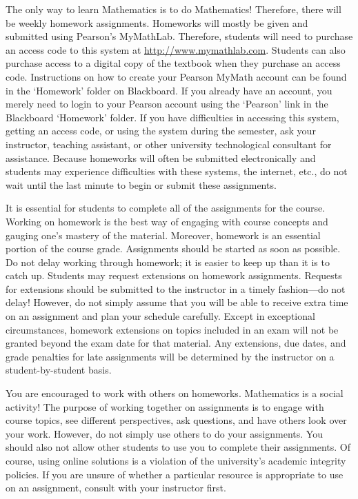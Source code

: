 \documentclass[11pt,letterpaper]{article}
\begin{document}

The only way to learn Mathematics is to do Mathematics! Therefore, there will be weekly homework assignments. Homeworks will mostly be given and submitted using Pearson's MyMathLab. Therefore, students will need to purchase an access code to this system at \url{http://www.mymathlab.com}. Students can also purchase access to a digital copy of the textbook when they purchase an access code. Instructions on how to create your Pearson MyMath account can be found in the `Homework' folder on Blackboard. If you already have an account, you merely need to login to your Pearson account using the `Pearson' link in the Blackboard `Homework' folder. If you have difficulties in accessing this system, getting an access code, or using the system during the semester, ask your instructor, teaching assistant, or other university technological consultant for assistance. Because homeworks will often be submitted electronically and students may experience difficulties with these systems, the internet, etc., do not wait until the last minute to begin or submit these assignments. \pspace

It is essential for students to complete all of the assignments for the course. Working on homework is the best way of engaging with course concepts and gauging one's mastery of the material. Moreover, homework is an essential portion of the course grade. Assignments should be started as soon as possible. Do not delay working through homework; it is easier to keep up than it is to catch up. Students may request extensions on homework assignments. Requests for extensions should be submitted to the instructor in a timely fashion---do not delay! However, do not simply assume that you will be able to receive extra time on an assignment and plan your schedule carefully. Except in exceptional circumstances, homework extensions on topics included in an exam will not be granted beyond the exam date for that material. Any extensions, due dates, and grade penalties for late assignments will be determined by the instructor on a student-by-student basis. \pspace

You are encouraged to work with others on homeworks. Mathematics is a social activity! The purpose of working together on assignments is to engage with course topics, see different perspectives, ask questions, and have others look over your work. However, do not simply use others to do your assignments. You should also not allow other students to use you to complete their assignments. Of course, using online solutions is a violation of the university's academic integrity policies. If you are unsure of whether a particular resource is appropriate to use on an assignment, consult with your instructor first. \pspace
\end{document}
